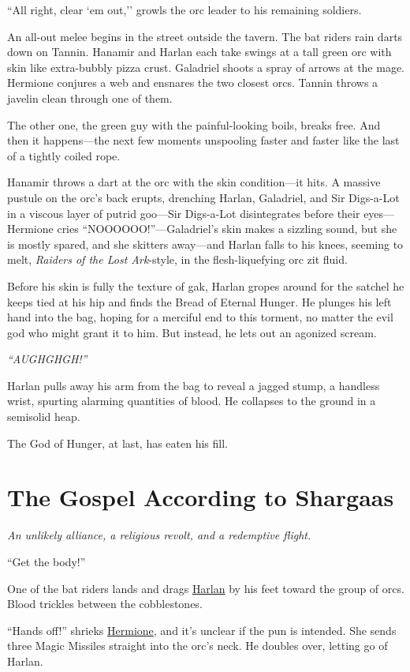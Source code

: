 \documentclass[smalldemyvopaper,11pt,twoside,onecolumn,openright,extrafontsizes]{memoir}
\newcommand{\chapdesc}[1]{
    \begin{flushright}
    \emph{{#1}}
    \end{flushright}
    \vspace{26pt}
}
\begin{document}
``All right, clear `em out,'' growls the orc leader to his remaining
soldiers.

An all-out melee begins in the street outside the tavern. The bat riders
rain darts down on Tannin. Hanamir and Harlan each take swings at a tall
green orc with skin like extra-bubbly pizza crust. Galadriel shoots a
spray of arrows at the mage. Hermione conjures a web and ensnares the
two closest orcs. Tannin throws a javelin clean through one of them.

The other one, the green guy with the painful-looking boils, breaks
free. And then it happens---the next few moments unspooling faster and
faster like the last of a tightly coiled rope.

Hanamir throws a dart at the orc with the skin condition---it hits. A
massive pustule on the orc's back erupts, drenching Harlan, Galadriel,
and Sir Digs-a-Lot in a viscous layer of putrid goo---Sir Digs-a-Lot
disintegrates before their eyes---Hermione cries
``NOOOOOO!''---Galadriel's skin makes a sizzling sound, but she is
mostly spared, and she skitters away---and Harlan falls to his knees,
seeming to melt, \emph{Raiders of the Lost Ark}-style, in the
flesh-liquefying orc zit fluid.

Before his skin is fully the texture of gak, Harlan gropes around for
the satchel he keeps tied at his hip and finds the Bread of Eternal
Hunger. He plunges his left hand into the bag, hoping for a merciful end
to this torment, no matter the evil god who might grant it to him. But
instead, he lets out an agonized scream.

\emph{``AUGHGHGH!''}

Harlan pulls away his arm from the bag to reveal a jagged stump, a
handless wrist, spurting alarming quantities of blood. He collapses to
the ground in a semisolid heap.

The God of Hunger, at last, has eaten his fill.


\chapter{The Gospel According to Shargaas}
\chapdesc{An unlikely alliance, a religious revolt, and a redemptive flight.}

``Get the body!''

One of the bat riders lands and drags \href{/characters/harlan/}{Harlan}
by his feet toward the group of orcs. Blood trickles between the
cobblestones.

``Hands off!'' shrieks \href{/characters/hermione/}{Hermione}, and it's
unclear if the pun is intended. She sends three Magic Missiles straight
into the orc's neck. He doubles over, letting go of Harlan.
\end{document}
